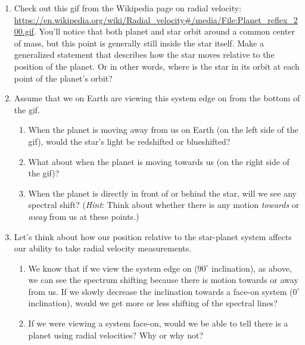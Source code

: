 \documentclass[11pt]{article}
\begin{document}
\begin{enumerate}
    \item Check out this gif from the Wikipedia page on radial velocity: \url{https://en.wikipedia.org/wiki/Radial_velocity#/media/File:Planet_reflex_200.gif}.  You'll notice that both planet and star orbit around a common center of mass, but this point is generally still inside the star itself.  Make a generalized statement that describes how the star moves relative to the position of the planet. Or in other words, where is the star in its orbit at each point of the planet's orbit?
        
    \item Assume that we on Earth are viewing this system edge on from the bottom of the gif.
        \begin{enumerate}
            \item When the planet is moving away from us on Earth (on the left side of the gif), would the star's light be redshifted or blueshifted?
            \item What about when the planet is moving towards us (on the right side of the gif)?
            \item When the planet is directly in front of or behind the star, will we see any spectral shift? (\textit{Hint}: Think about whether there is any motion \textit{towards} or \textit{away} from us at these points.)
        \end{enumerate}
        
    \item Let's think about how our position relative to the star-planet system affects our ability to take radial velocity measurements.
        \begin{enumerate}
            \item We know that if we view the system edge on ($90^\circ$ inclination), as above, we can see the spectrum shifting because there is motion towards or away from us.  If we slowly decrease the inclination towards a face-on system ($0^\circ$ inclination), would we get more or less shifting of the spectral lines?
            \item If we were viewing a system face-on, would we be able to tell there is a planet using radial velocities? Why or why not?
        \end{enumerate}
        

\end{enumerate}
\end{document}
